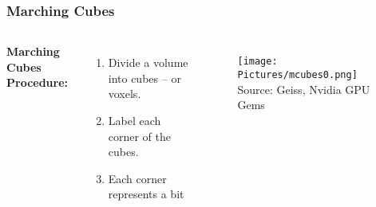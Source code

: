\documentclass[12pt]{beamer}
\begin{document}


        \begin{frame}
            \frametitle{Marching Cubes}
            \begin{columns}[c] %

                \textbf{Marching Cubes Procedure:}
                \begin{enumerate}
                    \item Divide a volume into cubes -- or voxels.
                    \item Label each corner of the cubes. 
                    \item Each corner represents a bit
                \end{enumerate}

                \begin{figure}
                    \texttt{[image: Pictures/mcubes0.png]}
                    \tiny{Source: Geiss, Nvidia GPU Gems}

                \end{figure}

            \end{columns}
        \end{frame}

\end{document}
